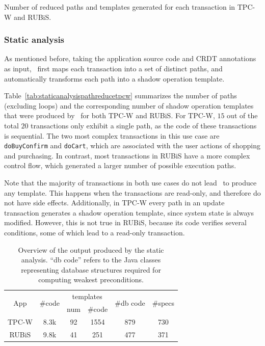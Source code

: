 \begin{table}[t!]
\caption{Number of reduced paths and templates generated for each transaction in TPC-W and RUBiS.}
    \label{tab:staticanalysispathreducetpcw}
\end{table}

\subsubsection{Static analysis}
As mentioned before, taking the application source code and CRDT annotations as input, \tool\
first maps each transaction into a set of distinct paths, and automatically transforms each path into a shadow operation template. 


Table~\ref{tab:staticanalysispathreducetpcw}
summarizes the number of paths (excluding loops) and the corresponding number of shadow operation templates that were produced by \tool\ for
both TPC-W and RUBiS. For TPC-W, $15$ out of the total $20$ transactions only exhibit
a single path, as the code of these transactions is sequential. The two most complex transactions in this use case are
\texttt{doBuyConfirm} and \texttt{doCart}, which are associated with the user actions of
shopping and purchasing.
In contrast, most transactions in RUBiS have a more complex control flow,
which generated a larger number of possible execution paths. 

Note that the majority of transactions in both use cases do not lead \tool\ to
produce any template. This happens when the transactions are read-only, and therefore do not have side effects. Additionally, in TPC-W every path in an update transaction
generates a shadow operation template, since system state is always modified. However, this is 
not true in RUBiS, because its code verifies several conditions, some of which lead to a read-only transaction. 
\begin{table}[t!]
\centering
    \begin{tabular}{ | c | c | c | c | c | c |}
    \hline
    \multirow{2}{*}{App} & \multirow{2}{*}{\#code} & \multicolumn{2}{c|}{templates} & \multirow{2}{*}{\#db code} & \multirow{2}{*}{\#specs}\\ \cline{3-4}
       &       &  num & \#code & & \\\hline
    TPC-W & 8.3k & 92 & 1554 & 879 & 730\\
    RUBiS & 9.8k & 41 & 251 & 477 & 371\\
    \hline
    \end{tabular}
    \caption{Overview of the output produced by the static analysis. ``db code'' refers to the Java classes representing  database structures required for computing weakest preconditions.}
    \label{tab:staticanalysisoutput}
\end{table}

